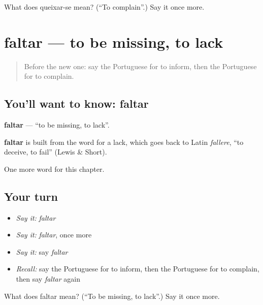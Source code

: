 \begin{tcolorbox}[breakable,colback=teal!4,colframe=teal!35!black,title={Before you move on}]
What does queixar-se mean? (\textquotedblleft{}To complain\textquotedblright{}.) Say it once more.
\end{tcolorbox}
\section[faltar]{faltar — to be missing, to lack}

\label{lesson:PT-C175-faltar}



\begin{quote}
Before the new one: say the Portuguese for to inform, then the Portuguese for to complain.
\end{quote}

\subsection*{You'll want to know: faltar}
\textbf{faltar} — \textquotedblleft{}to be missing, to lack\textquotedblright{}.

\begin{cousinweb}
\textbf{faltar} is built from the word for a lack, which goes back to Latin \emph{fallere}, \textquotedblleft{}to deceive, to fail\textquotedblright{} (Lewis \& Short).
\end{cousinweb}

\begin{grammarlens}[title={What you've built}]
One more word for this chapter.
\end{grammarlens}

\subsection*{Your turn}
\begin{itemize}
\raggedright
  \item \emph{Say it:} \emph{faltar}
  \item \emph{Say it:} \emph{faltar}, once more
  \item \emph{Say it:} say \emph{faltar}
  \item \emph{Recall:} say the Portuguese for to inform, then the Portuguese for to complain, then say \emph{faltar} again
\end{itemize}

\begin{tcolorbox}[breakable,colback=teal!4,colframe=teal!35!black,title={Before you move on}]
What does faltar mean? (\textquotedblleft{}To be missing, to lack\textquotedblright{}.) Say it once more.
\end{tcolorbox}

